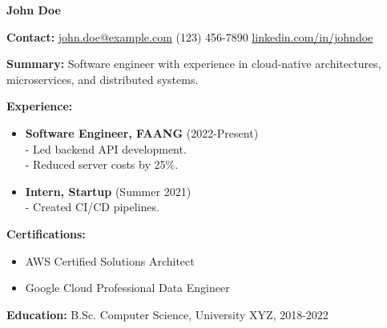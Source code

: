 \documentclass[a4paper,10pt]{article}
\begin{document}
\centerline{\LARGE \textbf{John Doe}}

\medskip

\noindent\textbf{Contact:} \href{mailto:john.doe@example.com}{john.doe@example.com} \textbar{} (123) 456-7890 \textbar{} \href{https://linkedin.com/in/johndoe}{linkedin.com/in/johndoe}

\medskip

\noindent\textbf{Summary:} Software engineer with experience in cloud-native architectures, microservices, and distributed systems.

\medskip

\noindent\textbf{Experience:}

\begin{itemize}[leftmargin=*]
    \item \textbf{Software Engineer, FAANG} (2022-Present) \\
    - Led backend API development. \\
    - Reduced server costs by 25\%.

    \item \textbf{Intern, Startup} (Summer 2021) \\
    - Created CI/CD pipelines.
\end{itemize}

\medskip

\noindent\textbf{Certifications:}
\begin{itemize}[leftmargin=*]
    \item AWS Certified Solutions Architect
    \item Google Cloud Professional Data Engineer
\end{itemize}

\medskip

\noindent\textbf{Education:} B.Sc. Computer Science, University XYZ, 2018-2022
\end{document}
